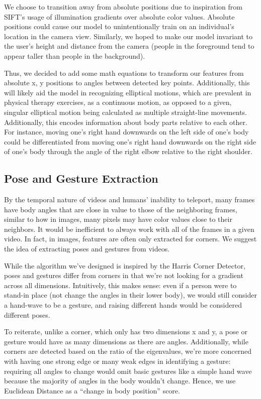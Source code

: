 \indent We choose to transition away from absolute positions due to inspiration from SIFT’s usage of illumination gradients over 
absolute color values. Absolute positions could cause our model to unintentionally train on an individual's location in the 
camera view. Similarly, we hoped to make our model invariant to the user’s height and distance from the camera 
(people in the foreground tend to appear taller than people in the background). 

\indent Thus, we decided to add some math equations to transform our features from absolute x, y positions to angles between detected 
key points. Additionally, this will likely aid the model in recognizing elliptical motions, which are prevalent in physical 
therapy exercises, as a continuous motion, as opposed to a given, singular elliptical motion being calculated as multiple 
straight-line movements. Additionally, this encodes information about body parts relative to each other. For 
instance, moving one’s right hand downwards on the left side of one’s body could be differentiated from moving 
one’s right hand downwards on the right side of one’s body through the angle of the right elbow relative to 
the right shoulder.

\subsection{Pose and Gesture Extraction}
\indent By the temporal nature of videos and humans’ inability to teleport, many frames have body angles that are 
close in value to those of the neighboring frames, similar to how in images, many pixels may have color 
values close to their neighbors. It would be inefficient to always work with all of the frames in a given 
video. In fact, in images, features are often only extracted for corners. We suggest the idea of extracting 
poses and gestures from videos.

\indent While the algorithm we’ve designed is inspired by the Harris Corner Detector, poses and gestures differ from 
corners in that we’re not looking for a gradient across all dimensions. Intuitively, this makes sense: even 
if a person were to stand-in place (not change the angles in their lower body), we would still consider a 
hand-wave to be a gesture, and raising different hands would be considered different poses. 

\indent To reiterate, unlike a corner, which only has two dimensions x and y, a pose or gesture would have as many 
dimensions as there are angles. Additionally, while corners are detected based on the ratio of the 
eigenvalues, we’re more concerned with having one strong edge or many weak edges in identifying a gesture: 
requiring all angles to change would omit basic gestures like a simple hand wave because the majority of 
angles in the body wouldn’t change. Hence, we use Euclidean Distance as a “change in body position” score.


